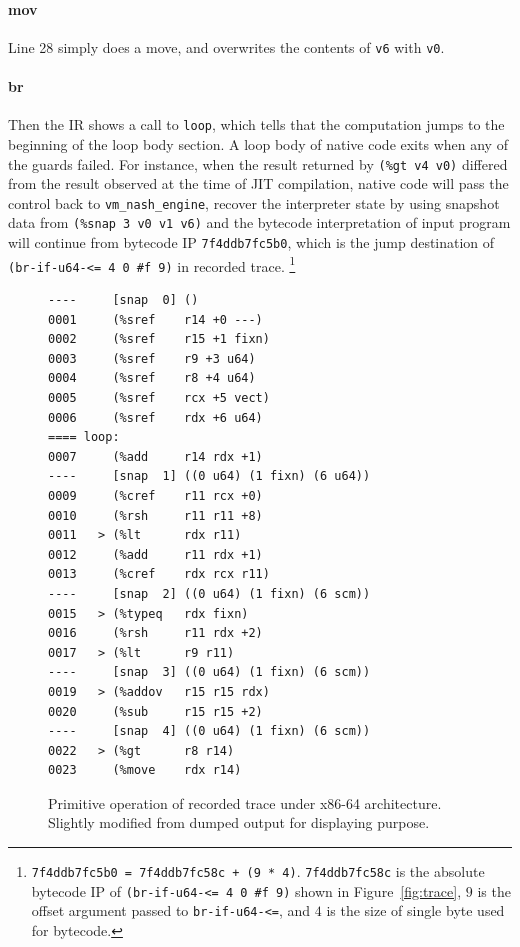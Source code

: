 \documentclass[preprint, 10pt]{sigplanconf}
\begin{document}
\paragraph{mov} Line 28 simply does a move, and overwrites the contents of
\texttt{v6} with \texttt{v0}.

\paragraph{br} Then the IR shows a call to \texttt{loop}, which tells that the
computation jumps to the beginning of the loop body section. A loop body of
native code exits when any of the guards failed.  For instance, when the
result returned by \texttt{(\%gt~v4~v0)} differed from the result observed at
the time of JIT compilation, native code will pass the control back to
\texttt{vm\_nash\_engine}, recover the interpreter state by using snapshot
data from \texttt{(\%snap~3~v0~v1~v6)} and the bytecode interpretation of
input program will continue from bytecode IP \texttt{7f4ddb7fc5b0}, which is
the jump destination of \texttt{(br-if-u64-<=~4~0~\#f~9)} in recorded trace.
\footnote{ \texttt{7f4ddb7fc5b0 = 7f4ddb7fc58c + (9 * 4)}.
  \texttt{7f4ddb7fc58c} is the absolute bytecode IP of \texttt{(br-if-u64-<= 4
    0 \#f 9)} shown in Figure~\hyperref[fig:trace]{\ref{fig:trace}}, $9$ is
  the offset argument passed to \texttt{br-if-u64-<=}, and $4$ is the size of
  single byte used for bytecode.}

\begin{figure}
  \centering
  \small
\begin{verbatim}
----     [snap  0] ()
0001     (%sref    r14 +0 ---)
0002     (%sref    r15 +1 fixn)
0003     (%sref    r9 +3 u64)
0004     (%sref    r8 +4 u64)
0005     (%sref    rcx +5 vect)
0006     (%sref    rdx +6 u64)
==== loop:
0007     (%add     r14 rdx +1)
----     [snap  1] ((0 u64) (1 fixn) (6 u64))
0009     (%cref    r11 rcx +0)
0010     (%rsh     r11 r11 +8)
0011   > (%lt      rdx r11)
0012     (%add     r11 rdx +1)
0013     (%cref    rdx rcx r11)
----     [snap  2] ((0 u64) (1 fixn) (6 scm))
0015   > (%typeq   rdx fixn)
0016     (%rsh     r11 rdx +2)
0017   > (%lt      r9 r11)
----     [snap  3] ((0 u64) (1 fixn) (6 scm))
0019   > (%addov   r15 r15 rdx)
0020     (%sub     r15 r15 +2)
----     [snap  4] ((0 u64) (1 fixn) (6 scm))
0022   > (%gt      r8 r14)
0023     (%move    rdx r14)
\end{verbatim}
\caption{Primitive operation of recorded trace under x86-64
  architecture. Slightly modified from dumped output for displaying purpose.}
\label{fig:primops}
\end{figure}
\end{document}
